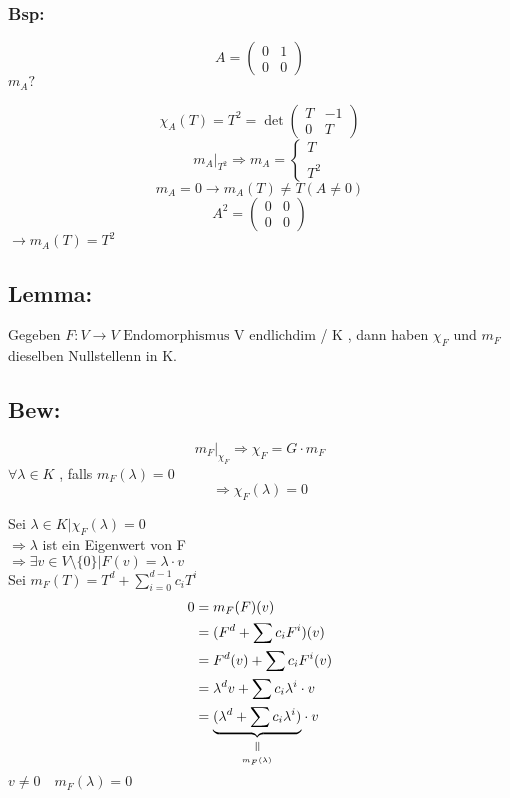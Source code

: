 \documentclass[titlepage,12pt,a4paper,ngerman]{report}
\newcommand{\verteq}{\rotatebox{90}{$\,=$}}
\newcommand{\equalto}[2]{\underset{\scriptstyle\overset{\mkern4mu\verteq}{#2}}{#1}}
\newcommand{\ub}[1]{\underbrace{#1}}
\newcommand{\enph}{F: V \to V \textrm{ Endomorphismus}}
\begin{document}
\subsubsection{Bsp:}
$$A = \begin{pmatrix}
0 & 1 \\
0 & 0
\end{pmatrix}$$
$m_A? $

$$\chi_A(T) = T^2 = \det\begin{pmatrix}
T & -1 \\
0 & T
\end{pmatrix}$$
$$m_A|_{T^2} \Rightarrow m_A = \left\{ \begin{array}{ll}
T \\ \\ T^2
\end{array} \right.$$
$$m_A = 0 \rightarrow m_A(T) \neq T (A\neq 0)$$
$$A^2 = \begin{pmatrix}
0 & 0\\
0 & 0
\end{pmatrix}$$
$\rightarrow m_A(T) = T^2$
\subsection{Lemma:}
Gegeben $\enph$ V endlichdim / K , dann haben $\chi_F$ und $m_F$ dieselben Nullstellenn in K.
\subsection{Bew:}
$$m_F|_{\chi_F} \Rightarrow \chi_F = G \cdot m_F$$
$\forall \lambda \in K$ , falls $m_F(\lambda) = 0$
$$ \Rightarrow \chi_F(\lambda) = 0$$

Sei $\lambda \in K | \chi_F(\lambda) = 0$\\
$\Rightarrow \lambda$ ist ein Eigenwert von F \\
$\Rightarrow \exists v \in V\setminus \{0\} | F(v) = \lambda\cdot v$\\
Sei $m_F(T) = T^d + \sum_{i=0}^{d-1} c_i T^i$\\
\begin{align*}
0 &= m_F(F) (v)\\
&= (F^d + \sum c_i F^i)(v)\\
&= F^d(v) + \sum c_i F^i(v) \\
&= \lambda^d v + \sum c_i \lambda^i \cdot v\\
&= \equalto{\ub{(\lambda^d + \sum c_i \lambda^i)}}{_{m_F(\lambda)}} \cdot v
\end{align*}
$v\neq 0 \quad m_F(\lambda) = 0$
\end{document}
